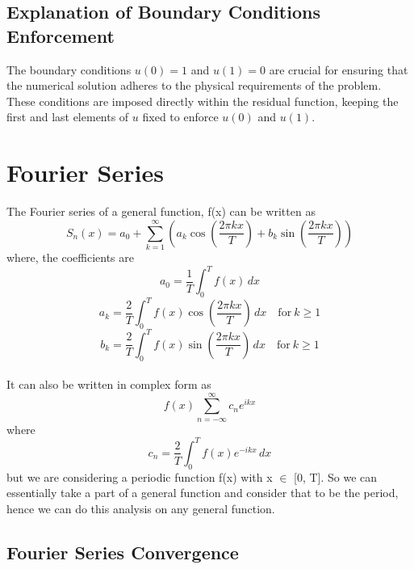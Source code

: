 \documentclass[12pt]{report} %
\begin{document}
\section*{Explanation of Boundary Conditions Enforcement}
The boundary conditions \( u(0) = 1 \) and \( u(1) = 0 \) are crucial for ensuring that the numerical solution adheres to the physical requirements of the problem. These conditions are imposed directly within the residual function, keeping the first and last elements of \( u \) fixed to enforce \( u(0) \) and \( u(1) \).


\chapter{Fourier Series}

\noindent The Fourier series of a general function, f(x) can be written as
\begin{equation}
    S_n (x) = a_0 + \sum_{k=1}^{\infty} \left( a_k \cos\left(\frac{2 \pi k x}{T}\right) + b_k \sin\left(\frac{2 \pi k x}{T}\right) \right)   
\end{equation}\label{eq:fourierseries}
\noindent where, the coefficients are
\begin{equation}
    a_0 = \frac{1}{T} \int_0^T f(x) \, dx
\end{equation}\label{eq:fourier_a0}
\begin{equation}
    a_k = \frac{2}{T} \int_0^T f(x) \cos\left(\frac{2 \pi k x}{T}\right) \, dx \quad \text{for} \ k \geq 1
\end{equation}\label{eq:fourier_ak}
\begin{equation}
    b_k = \frac{2}{T} \int_0^T f(x) \sin\left(\frac{2 \pi k x}{T}\right) \, dx \quad \text{for} \ k \geq 1
\end{equation}\label{eq:fourier_bk}
\\
\noindent It can also be written in complex form as
\begin{equation}
    f(x) \sum_{n= -\infty}^{\infty} c_n e^{ikx}
\end{equation}
where
\begin{equation}
    c_n = \frac{2}{T} \int_0^T f(x) e^{-ikx} \, dx 
\end{equation}
but we are considering a periodic function f(x) with x $\in$ [0, T]. So we can essentially take a part of a general function and consider that to be the period, hence we can do this analysis on any general function.

\dotfill

\section{Fourier Series Convergence}
\end{document}

